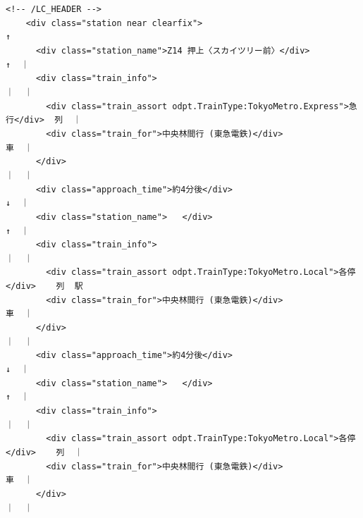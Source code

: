\begin{frameboxit}{160.0mm}
	\verb|<!-- /LC_HEADER -->                                                                   | \\
	\verb|    <div class="station near clearfix">                                             ↑| \\
	\verb|      <div class="station_name">Z14 押上〈スカイツリー前〉</div>                   ↑  ｜| \\
	\verb|      <div class="train_info">                                                  ｜  ｜| \\
	\verb|        <div class="train_assort odpt.TrainType:TokyoMetro.Express">急行</div>  列  ｜| \\
	\verb|        <div class="train_for">中央林間行 (東急電鉄)</div>                        車  ｜| \\
	\verb|      </div>                                                                    ｜  ｜| \\
	\verb|      <div class="approach_time">約4分後</div>                                  ↓  ｜| \\
	\verb|      <div class="station_name">   </div>                                        ↑  ｜| \\
	\verb|      <div class="train_info">                                                  ｜  ｜| \\
	\verb|        <div class="train_assort odpt.TrainType:TokyoMetro.Local">各停</div>    列  駅| \\
	\verb|        <div class="train_for">中央林間行 (東急電鉄)</div>                        車  ｜| \\
	\verb|      </div>                                                                    ｜  ｜| \\
	\verb|      <div class="approach_time">約4分後</div>                                  ↓  ｜| \\
	\verb|      <div class="station_name">   </div>                                        ↑  ｜| \\
	\verb|      <div class="train_info">                                                  ｜  ｜| \\
	\verb|        <div class="train_assort odpt.TrainType:TokyoMetro.Local">各停</div>    列  ｜| \\
	\verb|        <div class="train_for">中央林間行 (東急電鉄)</div>                        車  ｜| \\
	\verb|      </div>                                                                    ｜  ｜| \\

\end{frameboxit}
